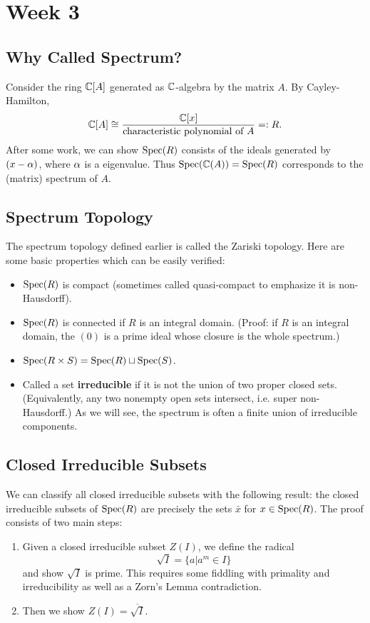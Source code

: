 \section{Week 3}

\subsection{Why Called Spectrum?}
Consider the ring ${\mathbb C}[A]$ generated as ${\mathbb C}$-algebra by the matrix $A$. By Cayley-Hamilton,
\[
    {\mathbb C}[A] \cong \frac{{\mathbb C}[x]}{\text{characteristic polynomial of } A} =: R.
\]
After some work, we can show $\operatorname{Spec}(R)$ consists of the ideals generated by $(x - \alpha)$, where $\alpha$ is a eigenvalue. Thus $\operatorname{Spec}({\mathbb C}(A)) = \operatorname{Spec}(R)$ corresponds to the (matrix) spectrum of $A$.

\subsection{Spectrum Topology}
The spectrum topology defined earlier is called the Zariski topology. Here are some basic properties which can be easily verified:
\begin{itemize}
    \item $\operatorname{Spec}(R)$ is compact (sometimes called quasi-compact to emphasize it is non-Hausdorff).
    \item $\operatorname{Spec}(R)$ is connected if $R$ is an integral domain. (Proof: if $R$ is an integral domain, the $(0)$ is a prime ideal whose closure is the whole spectrum.)
    \item $\operatorname{Spec}(R \times S) = \operatorname{Spec}(R) \sqcup \operatorname{Spec}(S)$.
    \item Called a set \textbf{irreducible} if it is not the union of two proper closed sets. (Equivalently, any two nonempty open sets intersect, i.e. super non-Hausdorff.) As we will see, the spectrum is often a finite union of irreducible components.
\end{itemize}

\subsection{Closed Irreducible Subsets}
We can classify all closed irreducible subsets with the following result: the closed irreducible subsets of $\operatorname{Spec}(R)$ are precisely the sets $\bar{x}$ for $x \in \operatorname{Spec}(R)$. The proof consists of two main steps:
\begin{enumerate}
    \item Given a closed irreducible subset $Z(I)$, we define the radical
    \[
        \sqrt{I} = \{a | a^m \in I\}
    \]
    and show $\sqrt{I}$ is prime. This requires some fiddling with primality and irreducibility as well as a Zorn's Lemma contradiction.
    \item Then we show $Z(I) = \overline{\sqrt{I}}$.
\end{enumerate}

